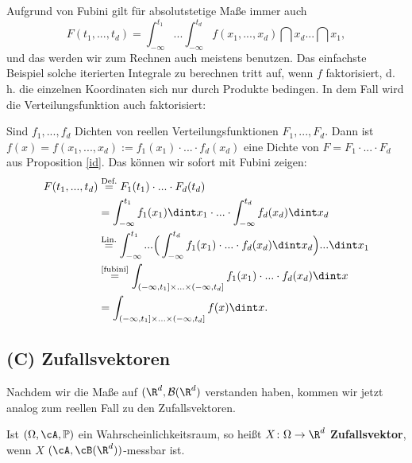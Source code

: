 Aufgrund von Fubini gilt f\"ur absolutstetige Ma\ss e immer auch
 \[ F(t_1,...,t_d) = \int_{-\infty}^{t_1}...\int_{-\infty}^{t_d}f(x_1,...,x_d)\dint x_d... \dint x_1,\]
und das werden wir zum Rechnen auch meistens benutzen. Das einfachste Beispiel solche iterierten Integrale zu berechnen tritt auf, wenn $f$ faktorisiert, d. h. die einzelnen Koordinaten sich nur durch Produkte bedingen. In dem Fall wird die Verteilungsfunktion auch faktorisiert:
\begin{beispiel}\label{dichte}
	Sind $f_1,...,f_d$ Dichten von reellen Verteilungsfunktionen $F_1,...,F_d$. Dann ist $f(x)= f(x_1,...,x_d) := f_1(x_1)\cdot ... \cdot f_d(x_d)$ eine Dichte von $F=F_1\cdot ... \cdot F_d$ aus Proposition \ref{id}. Das k\"onnen wir sofort mit Fubini zeigen:
	\begin{align*}
		F(t_1,...,t_d) &\overset{\text{Def.}}{=} F_1(t_1)\cdot ... \cdot F_d(t_d)\\
		& = \int_{-\infty}^{t_1} f_1(x_1) \dint x_1 \cdot ... \cdot \int_{-\infty}^{t_d} f_d(x_d) \dint x_d \\
		&\overset{\text{Lin.}}{=} \int_{-\infty}^{t_1} ... \Big(\int_{-\infty}^{t_d} f_1(x_1)\cdot ... \cdot f_d(x_d) \dint x_d\Big) ... \dint x_1 \\
		&\overset{\text{\ref{fubini}}}{=} \int_{(-\infty,t_1] \times ... \times (-\infty,t_d]} f_1(x_1)\cdot ... \cdot f_d(x_d) \dint x\\
		&= \int_{(-\infty,t_1]\times ...\times (-\infty,t_d]}f(x)\dint x.
	\end{align*}
\end{beispiel}

\subsection*{(C) Zufallsvektoren}
Nachdem wir die Ma\ss e auf $(\R^d, \mathcal B(\R^d)$ verstanden haben, kommen wir jetzt analog zum reellen Fall zu den Zufallsvektoren.
\begin{deff}
	Ist $(\Omega, \cA, \mathbb{P})$ ein Wahrscheinlichkeitsraum, so heißt $X \colon \Omega \to \R^d$ \textbf{Zufallsvektor}, wenn $X$ $(\cA, \cB(\R^d))$-messbar ist.
\end{deff}


